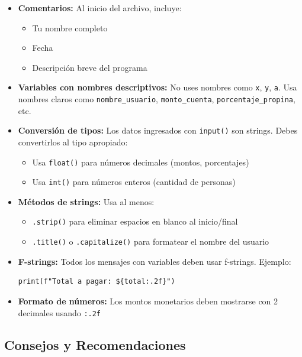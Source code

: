 \documentclass[12pt,a4paper]{article}
\begin{document}
\begin{itemize}[leftmargin=*]
    \item \textbf{Comentarios:} Al inicio del archivo, incluye:
    \begin{itemize}
        \item Tu nombre completo
        \item Fecha
        \item Descripción breve del programa
    \end{itemize}
    
    \item \textbf{Variables con nombres descriptivos:} No uses nombres como \texttt{x}, \texttt{y}, \texttt{a}. Usa nombres claros como \texttt{nombre\_usuario}, \texttt{monto\_cuenta}, \texttt{porcentaje\_propina}, etc.
    
    \item \textbf{Conversión de tipos:} Los datos ingresados con \texttt{input()} son strings. Debes convertirlos al tipo apropiado:
    \begin{itemize}
        \item Usa \texttt{float()} para números decimales (montos, porcentajes)
        \item Usa \texttt{int()} para números enteros (cantidad de personas)
    \end{itemize}
    
    \item \textbf{Métodos de strings:} Usa al menos:
    \begin{itemize}
        \item \texttt{.strip()} para eliminar espacios en blanco al inicio/final
        \item \texttt{.title()} o \texttt{.capitalize()} para formatear el nombre del usuario
    \end{itemize}
    
    \item \textbf{F-strings:} Todos los mensajes con variables deben usar f-strings. Ejemplo:
    \begin{lstlisting}
print(f"Total a pagar: ${total:.2f}")
    \end{lstlisting}
    
    \item \textbf{Formato de números:} Los montos monetarios deben mostrarse con 2 decimales usando \texttt{:.2f}
\end{itemize}

\subsection{Consejos y Recomendaciones}
\end{document}
